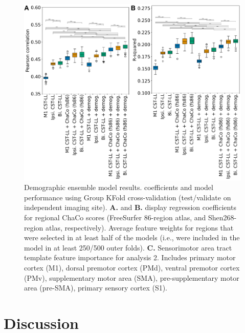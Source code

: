 \documentclass[10pt]{article}
\begin{document}
\begin{figure}[htp]
\centering
\includegraphics[width=1\linewidth]{figures/Analysis8.png}
\caption{Demographic ensemble model results. coefficients and model performance using Group KFold cross-validation (test/validate on independent imaging site). \textbf{A.} and \textbf{B.} display regression coefficients for regional ChaCo scores (FreeSurfer 86-region atlas, and Shen268-region atlas, respectively). Average feature weights for regions that were selected in at least half of the models (i.e., were included in the model in at least 250/500 outer folds). \textbf{C.} Sensorimotor area tract template feature importance for analysis 2. Includes primary motor cortex (M1), dorsal premotor cortex (PMd), ventral premotor cortex (PMv), supplementary motor area (SMA), pre-supplementary motor area (pre-SMA), primary sensory cortex (S1).}
\label{nemotool}
\end{figure}


\section{Discussion}

\clearpage

\newcommand{\beginsupplement}{%
\setcounter{table}{0}
\renewcommand{\thetable}{S\arabic{table}}%
\setcounter{figure}{0}
\renewcommand{\thefigure}{S\arabic{figure}}%
}

\printbibliography

\beginsupplement
\end{document}
